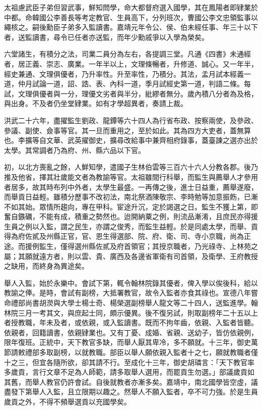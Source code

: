 太祖慮武臣子弟但習武事，鮮知問學，命大都督府選入國學，其在鳳陽者即肄業於中都。命韓國公李善長等考定教官、生員高下，分列班次，曹國公李文忠領監事以繩核之。嗣後勳臣子弟多入監讀書。嘉靖元年令公、侯、伯未經任事、年三十以下者，送監讀書，尋令已任者亦送監，而年少勳戚爭以入學為榮矣。

六堂諸生，有積分之法，司業二員分為左右，各提調三堂。凡通《四書》未通經者，居正義、崇志、廣業。一年半以上，文理條暢者，升修道、誠心。又一年半，經史兼通、文理俱優者，乃升率性。升至率性，乃積分。其法，孟月試本經義一道，仲月試論一道，詔、誥、表、內科一道，季月試經史第一道，判語二條。每試，文理俱優者與一分，理優文劣者與半分，紕繆者無分。歲內積八分者為及格，與出身。不及者仍坐堂肄業。如有才學超異者，奏請上裁。

洪武二十六年，盡擢監生劉政、龍鐔等六十四人為行省布政、按察兩使，及參政、參議、副使、僉事等官。其一旦而重用之，至於如此。其為四方大吏者，蓋無算也。李擴等自文華、武英擢御史，擴尋改給事中兼齊相府錄事，蓋臺諫之選亦出於太學。其常調者乃為府、州、縣六品以下官。

初，以北方喪亂之餘，人鮮知學，遣國子生林伯雲等三百六十六人分教各郡。後乃推及他省，擇其壯歲能文者為教諭等官。太祖雖間行科舉，而監生與薦舉人才參用者居多，故其時布列中外者，太學生最盛。一再傳之後，進士日益重，薦舉遂廢，而舉貢日益輕。雖積分歷事不改初法，南北祭酒陳敬宗、李時勉等加意振飭，已漸不如其始。眾情所趨向，專在甲科。宦途升沉，定於謁選之日。監生不獲上第，即奮自鏃礪，不能有成，積重之勢然也。迨開納粟之例，則流品漸淆，且庶民亦得援生員之例以入監，謂之民生，亦謂之俊秀，而監生益輕。於是同處太學，而舉、貢得為府佐貳及州縣正官，官、恩生得選部、院、府、衛、司、寺小京職，尚為正途。而援例監生，僅得選州縣佐貳及府首領官；其授京職者，乃光祿寺、上林苑之屬；其願就遠方者，則以雲、貴、廣西及各邊省軍衛有司首領，及衛學、王府教授之缺用，而終身為異途矣。

舉人入監，始於永樂中。會試下第，輒令翰林院錄其優者，俾入學以俟後科，給以教諭之俸。是時，會試有副榜，大抵署教官，故令入監者亦食其祿也。宣德八年嘗命禮部尚書胡濙與大學士楊士奇、楊榮選副榜舉人龍文等二十四人，送監進學。翰林院三月一考其文，與庶起士同，頗示優異。後不復另試，則取副榜年二十五以上者授教職，年未及者，或依親，或入監讀書。既而不拘年齒，依親、入監者皆聽。依親者，回籍讀書，依親肄業也。又有丁憂、成婚、省親、送幼子，皆仿依親例，限年復班。正統中，天下教官多缺，而舉人厭其卑冷，多不願就。十三年，御史萬節請敕禮部多取副榜，以就教職。部臣以舉人願依親入監者十之七，願就教職者僅十之三，但宜各隨所欲，卻其請不行。至成化十三年，御史胡璘言：「天下教官率多歲貢，言行文章不足為人師範，請多取舉人選用，而罷貢生勿選。」部議歲貢如其舊，而舉人教官仍許會試。自後就教者亦漸多矣。嘉靖中，南北國學皆空虛，議盡發下第舉人入監，且立限期以趣之。然舉人不願入監者，卒不可力強。於是生員歲貢之外，不得不頻舉選貢以充國學矣。

